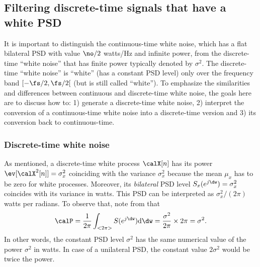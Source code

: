 
\subsection{{\akadvanced} Filtering discrete-time signals that have a white PSD}
\label{sec:conversion_awgn}

It is important to distinguish the continuous-time white noise, which has a flat bilateral PSD with value $\no / 2$ watts/Hz and infinite power, from the discrete-time ``white noise'' that has finite power typically denoted by $\sigma^2$. The discrete-time ``white noise'' is ``white'' (has a constant PSD level) only over the frequency band $[-\fs/2, \fs/2[$ (but is still called ``white'').
To emphasize the similarities and differences between continuous and discrete-time white noise, the goals here are to discuss how to: 1) generate a discrete-time white noise, 2) interpret the conversion of a continuous-time white noise into a discrete-time version and 3) its conversion back to continuous-time.

\subsubsection{Discrete-time white noise}

As mentioned, a discrete-time white process $\calX[n]$ has its power $\ev[\calX^2[n]]=\sigma_x^2$ coinciding with the variance $\sigma_x^2$ because the mean $\mu_x$ has to be zero for white processes. Moreover, its \emph{bilateral} PSD level $S_x(e^{j \dw}) = \sigma_x^2$ coincides with its variance in watts. 
This PSD can be interpreted as $\sigma_x^2 / (2 \pi)$ 
watts per radians.
To observe that, 
note from  that 
\[
\calP =  \frac{1}{2 \pi}\int_{<2 \pi>} S(e^{j \dw}) \textrm{d}\dw = \frac{\sigma^2}{2 \pi} \times 2 \pi = \sigma^2.
\]
In other words, the constant PSD level $\sigma^2$ has the same numerical value of the power $\sigma^2$ in watts.
In case of a unilateral PSD, the constant value $2\sigma^2$ would be twice the power.

